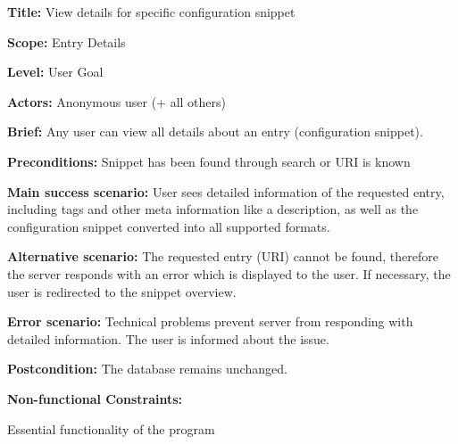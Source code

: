 
\begin{DoxyItemize}
\item {\bfseries Title\+:} View details for specific configuration snippet
\item {\bfseries Scope\+:} Entry Details
\item {\bfseries Level\+:} User Goal
\item {\bfseries Actors\+:} Anonymous user (+ all others)
\item {\bfseries Brief\+:} Any user can view all details about an entry (configuration snippet).
\end{DoxyItemize}


\begin{DoxyItemize}
\item {\bfseries Preconditions\+:} Snippet has been found through search or U\+RI is known
\item {\bfseries Main success scenario\+:} User sees detailed information of the requested entry, including tags and other meta information like a description, as well as the configuration snippet converted into all supported formats.
\item {\bfseries Alternative scenario\+:} The requested entry (U\+RI) cannot be found, therefore the server responds with an error which is displayed to the user. If necessary, the user is redirected to the snippet overview.
\item {\bfseries Error scenario\+:} Technical problems prevent server from responding with detailed information. The user is informed about the issue.
\item {\bfseries Postcondition\+:} The database remains unchanged.
\item {\bfseries Non-\/functional Constraints\+:}
\begin{DoxyItemize}
\item Essential functionality of the program 
\end{DoxyItemize}
\end{DoxyItemize}